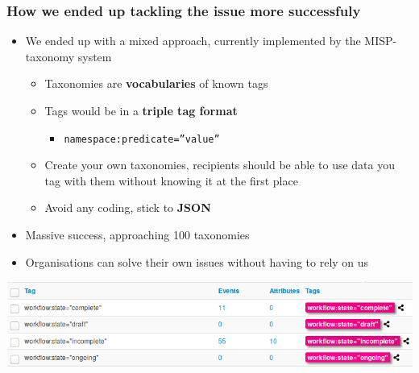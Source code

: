 \begin{frame}
\frametitle{How we ended up tackling the issue more successfuly}
\begin{itemize}
       \item We ended up with a mixed approach, currently implemented by the MISP-taxonomy system
        \begin{itemize}
                \item Taxonomies are {\bf vocabularies} of known tags
                \item Tags would be in a {\bf triple tag format}
                    \begin{itemize}
                        \item[] \texttt{namespace:predicate=''value''}
                    \end{itemize}
                \item Create your own taxonomies, recipients should be able to use data you tag with them without knowing it at the first place
                \item Avoid any coding, stick to {\bf JSON}
        \end{itemize}
        \item Massive success, approaching 100 taxonomies
        \item Organisations can solve their own issues without having to rely on us
\end{itemize}
\includegraphics[scale=0.4]{taxonomy-workflow.png}
\end{frame}

